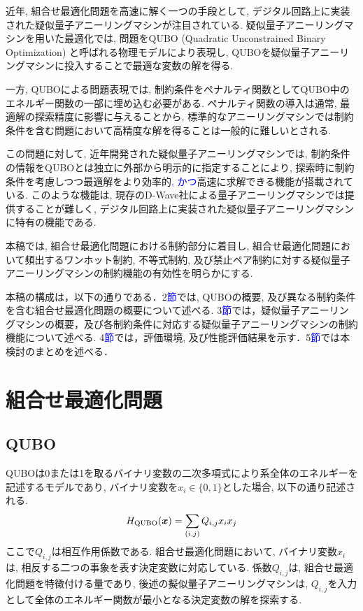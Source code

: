 \documentclass[submit,techrep,noauthor]{ipsj}
\begin{document}
近年, 組合せ最適化問題を高速に解く一つの手段として, デジタル回路上に実装された疑似量子アニーリングマシンが注目されている. 疑似量子アニーリングマシンを用いた最適化では, 問題をQUBO (Quadratic Unconstrained Binary Optimization) と呼ばれる物理モデルにより表現し, QUBOを疑似量子アニーリングマシンに投入することで最適な変数の解を得る.

一方, QUBOによる問題表現では, 制約条件をペナルティ関数としてQUBO中のエネルギー関数の一部に埋め込む必要がある. ペナルティ関数の導入は通常, 最適解の探索精度に影響に与えることから, 標準的なアニーリングマシンでは制約条件を含む問題において高精度な解を得ることは一般的に難しいとされる\cite{ozeki, onoda2}.

この問題に対して, 近年開発された疑似量子アニーリングマシンでは, 制約条件の情報をQUBOとは独立に外部から明示的に指定することにより, 探索時に制約条件を考慮しつつ最適解をより効率的\textcolor{blue}{, かつ}高速に求解できる機能が搭載されている\cite{takano, da3}. このような機能は, 現存のD-Wave社による量子アニーリングマシンでは提供することが難しく, デジタル回路上に実装された疑似量子アニーリングマシンに特有の機能である. 

本稿では, 組合せ最適化問題における制約部分に着目し, 組合せ最適化問題において頻出するワンホット制約, 不等式制約, 及び禁止ペア制約に対する疑似量子アニーリングマシンの制約機能の有効性を明らかにする.

本稿の構成は，以下の通りである．2\textcolor{blue}{節}では, QUBOの概要, 及び異なる制約条件を含む組合せ最適化問題の概要について述べる. 3\textcolor{blue}{節}では，疑似量子アニーリングマシンの概要，及び各制約条件に対応する疑似量子アニーリングマシンの制約機能について述べる. 4\textcolor{blue}{節}では，評価環境, 及び性能評価結果を示す．5\textcolor{blue}{節}では本検討のまとめを述べる．

\section{組合せ最適化問題}

\subsection{QUBO}
QUBOは0または1を取るバイナリ変数の二次多項式により系全体のエネルギーを記述するモデルであり, バイナリ変数を$x_{i}\in\{0, 1\}$とした場合, 以下の通り記述される.
\begin{equation}
H_{\rm{QUBO}}(\bm{x}) = \sum_{(i,j)} Q_{i,j}x_{i}x_{j}
\label{H_qubo}
\end{equation}
ここで$Q_{i,j}$は相互作用係数である. 組合せ最適化問題において, バイナリ変数$x_{i}$は, 相反する二つの事象を表す決定変数に対応している. 係数$Q_{i,j}$は, 組合せ最適化問題を特徴付ける量であり, 後述の擬似量子アニーリングマシンは, $Q_{i,j}$を入力として全体のエネルギー関数が最小となる決定変数の解を探索する. 
\end{document}
